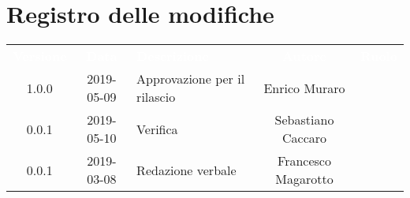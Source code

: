 \section*{Registro delle modifiche}
{
	\renewcommand{\arraystretch}{1.5}
	\centering
	\begin{longtable}{ c c  C{4cm}  c  c }
		
		\textcolor{white}{\textbf{Versione}} & \textcolor{white}{\textbf{Data}} & \textcolor{white}{\textbf{Descrizione}} & \textcolor{white}{\textbf{Autore}} & \textcolor{white}{\textbf{Ruolo}}\\
		1.0.0 & 2019-05-09 & Approvazione per il rilascio & Enrico Muraro & \Res{}\\
		0.0.1 & 2019-05-10 & Verifica & Sebastiano Caccaro & \ver{}\\
		0.0.1 & 2019-03-08 & Redazione verbale & Francesco Magarotto & \reda{}\\
		
		
	\end{longtable}
	
}